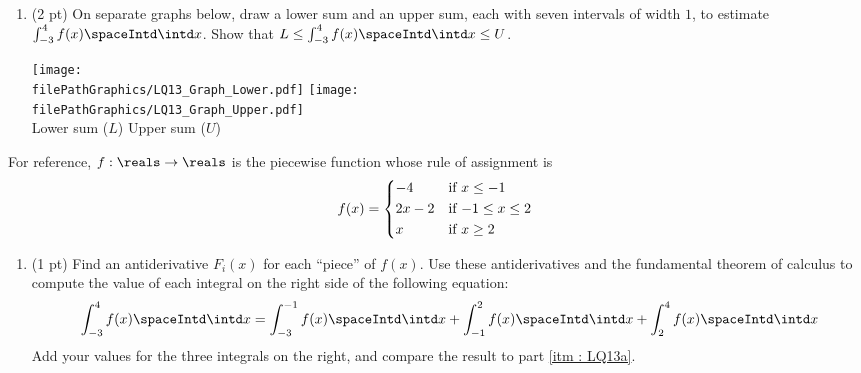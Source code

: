 \begin{enumerate}[resume,label=(\alph*)]
\item\label{itm : LQ13b} (2 pt) On separate graphs below, draw a lower sum and an upper sum, each with seven intervals of width $1$, to estimate $\int_{-3}^{4} f(x) \spaceIntd \intd x$. Show that $L \leq \int_{-3}^{4} f(x) \spaceIntd \intd x \leq U$.
\begin{center}
\texttt{[image: \\filePathGraphics/LQ13\_Graph\_Lower.pdf]}%
\hspace{1in}
\texttt{[image: \\filePathGraphics/LQ13\_Graph\_Upper.pdf]}%
\\
Lower sum ($L$)
\hspace{2.3in}
Upper sum ($U$)
\end{center}
\end{enumerate}




\noindent{}For reference, $f : \reals \rightarrow \reals$ is the piecewise function whose rule of assignment is
\begin{align*}
f(x)
=
\begin{dcases*}
-4		&	if $x \leq -1$		\\
2 x - 2	&	if $-1 \leq x \leq 2$	\\
x		&	if $x \geq 2$
\end{dcases*}
\end{align*}

\begin{enumerate}[resume,label=(\alph*)]
\item\label{itm : LQ13c} (1 pt) Find an antiderivative $F_{i}(x)$ for each ``piece'' of $f(x)$. Use these antiderivatives and the fundamental theorem of calculus to compute the value of each integral on the right side of the following equation:
\begin{align}
\int_{-3}^{4} f(x) \spaceIntd \intd x
=
\int_{-3}^{-1} f(x) \spaceIntd \intd x
+
\int_{-1}^{2} f(x) \spaceIntd \intd x
+
\int_{2}^{4} f(x) \spaceIntd \intd x%
\label{eq : LQ13 Piecewise Integral}
\end{align}
Add your values for the three integrals on the right, and compare the result to part \ref{itm : LQ13a}.
\end{enumerate}

